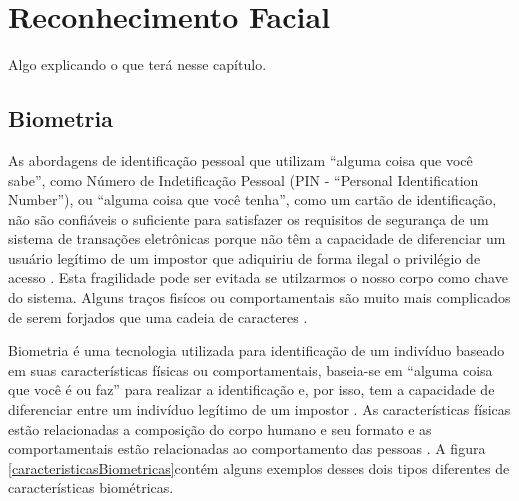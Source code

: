 

\chapter{Reconhecimento Facial}

	Algo explicando o que terá nesse capítulo.

\section{Biometria}

As abordagens de identificação pessoal que utilizam ``alguma coisa que você sabe'', como Número de Indetificação Pessoal (PIN - ``Personal Identification Number''), ou ``alguma coisa que você tenha'', como um cartão de identificação, não são confiáveis o suficiente para satisfazer os requisitos de segurança de um sistema de transações eletrônicas porque não têm a capacidade de diferenciar um usuário legítimo de um impostor que adiquiriu de forma ilegal o privilégio de acesso \cite{hong}. Esta fragilidade pode ser evitada se utilzarmos o nosso corpo como chave do sistema. Alguns traços fisícos ou comportamentais são muito mais complicados de serem forjados que uma cadeia de caracteres \cite{drovetto}.

Biometria é uma tecnologia utilizada para identificação de um indivíduo baseado em suas características físicas ou comportamentais, baseia-se em ``alguma coisa que você é ou faz'' para realizar a identificação e, por isso, tem a capacidade de diferenciar entre um indivíduo legítimo de um impostor \cite{hong}. As características físicas estão relacionadas a composição do corpo humano e seu formato e as comportamentais estão relacionadas ao comportamento das pessoas \cite{drovetto}. A figura \ref{caracteristicasBiometricas}contém alguns exemplos desses dois tipos diferentes de características biométricas.

